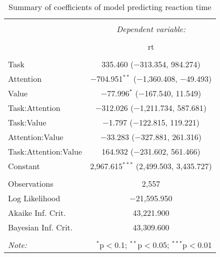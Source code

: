 
\begin{table}[!b] \centering 
  \caption{Summary of coefficients of model predicting reaction time} 
  \label{table:rtModel} 
\begin{tabular}{@{\extracolsep{5pt}}lc} 
\\[-1.8ex]\hline 
\hline \\[-1.8ex] 
 & \multicolumn{1}{c}{\textit{Dependent variable:}} \\ 
\cline{2-2} 
\\[-1.8ex] & rt \\ 
\hline \\[-1.8ex] 
 Task & 335.460 ($-$313.354, 984.274) \\ 
  Attention & $-$704.951$^{**}$ ($-$1,360.408, $-$49.493) \\ 
  Value & $-$77.996$^{*}$ ($-$167.540, 11.549) \\ 
  Task:Attention & $-$312.026 ($-$1,211.734, 587.681) \\ 
  Task:Value & $-$1.797 ($-$122.815, 119.221) \\ 
  Attention:Value & $-$33.283 ($-$327.881, 261.316) \\ 
  Task:Attention:Value & 164.932 ($-$231.602, 561.466) \\ 
  Constant & 2,967.615$^{***}$ (2,499.503, 3,435.727) \\ 
 \hline \\[-1.8ex] 
Observations & 2,557 \\ 
Log Likelihood & $-$21,595.950 \\ 
Akaike Inf. Crit. & 43,221.900 \\ 
Bayesian Inf. Crit. & 43,309.600 \\ 
\hline 
\hline \\[-1.8ex] 
\textit{Note:}  & \multicolumn{1}{r}{$^{*}$p$<$0.1; $^{**}$p$<$0.05; $^{***}$p$<$0.01} \\ 
\end{tabular} 
\end{table} 
